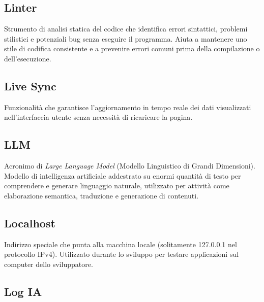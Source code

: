\documentclass[a4paper, 11pt, oneside]{scrartcl} %
\begin{document}
\subsection*{Linter}
Strumento di analisi statica del codice che identifica errori sintattici, problemi stilistici e potenziali bug senza eseguire il programma. Aiuta a mantenere uno stile di codifica consistente e a prevenire errori comuni prima della compilazione o dell'esecuzione.
\vspace{0.5cm}

\subsection*{Live Sync}
Funzionalità che garantisce l'aggiornamento in tempo reale dei dati visualizzati nell'interfaccia utente senza necessità di ricaricare la pagina.
\vspace{0.5cm}

\subsection*{LLM}
Acronimo di \textit{Large Language Model} (Modello Linguistico di Grandi Dimensioni). Modello di intelligenza artificiale addestrato su enormi quantità di testo per comprendere e generare linguaggio naturale, utilizzato per attività come elaborazione semantica, traduzione e generazione di contenuti.
\vspace{0.5cm}

\subsection*{Localhost}


Indirizzo speciale che punta alla macchina locale (solitamente 127.0.0.1 nel protocollo IPv4). Utilizzato durante lo sviluppo per testare applicazioni sul computer dello sviluppatore.

\vspace{0.5cm}

\subsection*{Log IA}

\end{document}
